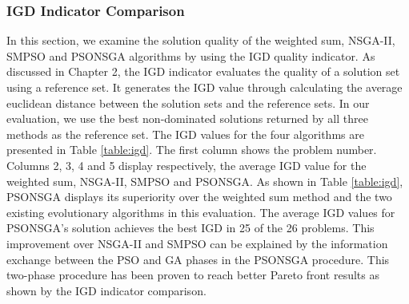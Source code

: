 \documentclass[10pt,journal,compsoc]{IEEEtran}
\newcommand{\Fig}[1]{Fig.~\ref{#1}}
\begin{document}
\subsubsection{IGD Indicator Comparison}

In this section, we examine the solution quality of the weighted sum, NSGA-II, SMPSO and PSONSGA algorithms by using the IGD quality indicator. As discussed in Chapter 2, the IGD indicator evaluates the quality of a solution set using a reference set. It generates the IGD value through calculating the average euclidean distance between the solution sets and the reference sets. In our evaluation, we use the best non-dominated solutions returned by all three methods as the reference set. The IGD values for the four algorithms are presented in Table \ref{table:igd}. The first column shows the problem number. Columns 2, 3, 4 and 5 display respectively, the average IGD value for the weighted sum, NSGA-II, SMPSO and PSONSGA. 
As shown in Table \ref{table:igd}, PSONSGA displays its superiority over the weighted sum method and the two existing evolutionary algorithms in this evaluation. The average IGD values for PSONSGA's solution achieves the best IGD in 25 of the 26 problems. This improvement over NSGA-II and SMPSO can be explained by the information exchange between the PSO and GA phases in the PSONSGA procedure. %
This two-phase procedure has been proven to reach better Pareto front results as shown by the IGD indicator comparison.
\end{document}
